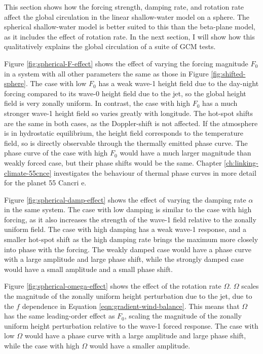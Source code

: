 This section shows how the forcing strength, damping rate, and rotation rate affect the global circulation in the linear shallow-water model on a sphere. The spherical shallow-water model is better suited to this than the beta-plane model, as it includes the effect of rotation rate. In the next section, I will show how this qualitatively explains the global circulation of a suite of GCM tests.

Figure \ref{fig:spherical-F-effect} shows the effect of varying the forcing magnitude $F_{0}$ in a system with all other parameters the same as those in Figure \ref{fig:shifted-sphere}. The case with low $F_{0}$ has a weak wave-1 height field due to the day-night forcing compared to its wave-0 height field due to the jet, so the global height field is very zonally uniform. In contrast, the case with high $F_{0}$ has a much stronger wave-1 height field so varies greatly with longitude. The hot-spot shifts are the same in both cases, as the Doppler-shift is not affected. If the atmosphere is in hydrostatic equilibrium, the height field corresponds to the temperature field, so is directly observable through the thermally emitted phase curve. The phase curve of the case with high $F_{0}$ would have a much larger magnitude than weakly forced case, but their phase shifts would be the same. Chapter \ref{ch:linking-climate-55cnce} investigates the behaviour of thermal phase curves in more detail for the planet 55 Cancri e.

Figure \ref{fig:spherical-damp-effect} shows the effect of varying the damping rate $\alpha$ in the same system. The case with low damping is similar to the case with high forcing, as it also increases the strength of the wave-1 field relative to the zonally uniform field. The case with high damping has a weak wave-1 response, and a smaller hot-spot shift as the high damping rate brings the maximum more closely into phase with the forcing. The weakly damped case would have a phase curve with a large amplitude and large phase shift, while the strongly damped case would have a small amplitude and a small phase shift.

Figure \ref{fig:spherical-omega-effect} shows the effect of the rotation rate $\Omega$. $\Omega$ scales the magnitude of the zonally uniform height perturbation due to the jet, due to the $f$ dependence in Equation \ref{eqn:gradient-wind-balance}. This means that $\Omega$ has the same leading-order effect as $F_{0}$, scaling the magnitude of the zonally uniform height perturbation relative to the wave-1 forced response. The case with low $\Omega$ would have a phase curve with a large amplitude and large phase shift, while the case with high $\Omega$ would have a smaller amplitude.




